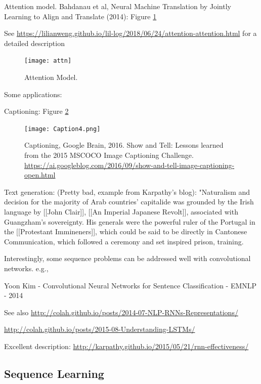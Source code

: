 \documentclass[english]{article}
\begin{document}
\item Attention model. Bahdanau et al, Neural Machine Translation by Jointly Learning to Align and Translate (2014): Figure \ref{attn}

See \url{https://lilianweng.github.io/lil-log/2018/06/24/attention-attention.html} for a detailed description


\begin{figure}
  \centering
  \texttt{[image: attn]}
    \caption{Attention Model.}
    \label{attn}
\end{figure}


\item Some applications: 

Captioning: Figure \ref{c}

\begin{figure}
  \centering
  \texttt{[image: Caption4.png]}
    \caption{Captioning,  Google Brain, 2016. Show and Tell: Lessons learned from the 2015 MSCOCO Image Captioning Challenge. \url{https://ai.googleblog.com/2016/09/show-and-tell-image-captioning-open.html}}
    \label{c}
\end{figure}

Text generation: (Pretty bad, example from Karpathy's blog): "Naturalism and decision for the majority of Arab countries' capitalide was grounded
by the Irish language by [[John Clair]], [[An Imperial Japanese Revolt]], associated  with Guangzham's sovereignty. His generals were the powerful ruler of the Portugal 
in the [[Protestant Immineners]], which could be said to be directly in Cantonese 
Communication, which followed a ceremony and set inspired prison, training.

\item Interestingly, some sequence problems can be addressed well with convolutional networks. e.g., 

Yoon Kim - Convolutional Neural Networks for Sentence Classification - EMNLP - 2014



\item See also \url{http://colah.github.io/posts/2014-07-NLP-RNNs-Representations/}

\url{http://colah.github.io/posts/2015-08-Understanding-LSTMs/}

Excellent description: \url{http://karpathy.github.io/2015/05/21/rnn-effectiveness/}

\eenum 

\subsection{Sequence Learning}
\end{document}
